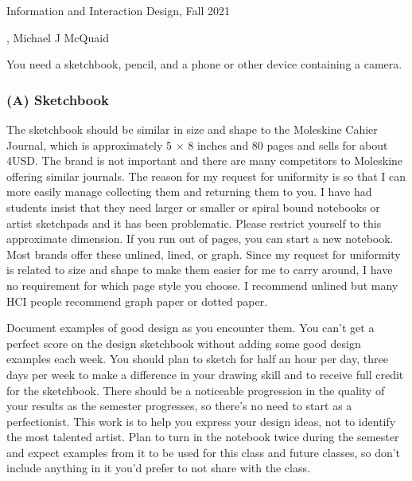 \phantom{0}

\vfill

Information and Interaction Design, Fall 2021

\textcopyright \the\year, Michael J McQuaid

\thispagestyle{empty}
\pagebreak

\tableofcontents

\pagebreak

\hypertarget{introduction}{%
\label{introduction}}

\hypertarget{materials-you-need}{%
\label{materials-you-need}}

You need a sketchbook, pencil, and a phone or other device containing a
camera.

\hypertarget{a-sketchbook}{%
\subsubsection{(A) Sketchbook}\label{a-sketchbook}}

The sketchbook should be similar in size and shape to the Moleskine
Cahier Journal, which is approximately 5 \(\times\) 8 inches and 80
pages and sells for about 4USD. The brand is not important and there are
many competitors to Moleskine offering similar journals. The reason for
my request for uniformity is so that I can more easily manage collecting
them and returning them to you. I have had students insist that they
need larger or smaller or spiral bound notebooks or artist sketchpads
and it has been problematic. Please restrict yourself to this
approximate dimension. If you run out of pages, you can start a new
notebook. Most brands offer these unlined, lined, or graph. Since my
request for uniformity is related to size and shape to make them easier
for me to carry around, I have no requirement for which page style you
choose. I recommend unlined but many HCI people recommend graph paper or
dotted paper.

Document examples of good design as you encounter them. You can't get a
perfect score on the design sketchbook without adding some good design
examples each week. You should plan to sketch for half an hour per day,
three days per week to make a difference in your drawing skill and to
receive full credit for the sketchbook. There should be a noticeable
progression in the quality of your results as the semester progresses,
so there's no need to start as a perfectionist. This work is to help you
express your design ideas, not to identify the most talented artist.
Plan to turn in the notebook twice during the semester and expect
examples from it to be used for this class and future classes, so don't
include anything in it you'd prefer to not share with the class.

